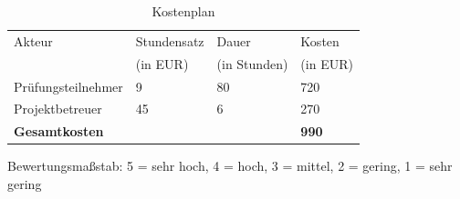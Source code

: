 \documentclass[11pt]{article}
\begin{document}
\clearpage
\printglossaries

\clearpage
\listoftables
\listoffigures
{}
\lstlistoflistings
\newpage

\begin{table}[H]
    \centering
    \begin{tabular}{|l|l|l|l|}
        \hline
        Akteur & Stundensatz & Dauer & Kosten \\
        & (in EUR) & (in Stunden) & (in EUR) \\
        \hline
        Prüfungsteilnehmer & 9 & 80 & 720 \\
        Projektbetreuer & 45 & 6 & 270 \\
        \hline
        \textbf{Gesamtkosten} &&& \textbf{990} \\
        \hline
        
    \end{tabular}
    \caption{Kostenplan}
    \label{table:costs}
\end{table}

\begin{table}[H]
    Bewertungsmaßstab: 5 = sehr hoch, 4 = hoch, 3 = mittel, 2 = gering, 1 = sehr gering
    \caption{Nutzwertanalyse}
    \label{table:weightedsum}
\end{table}
\end{document}

